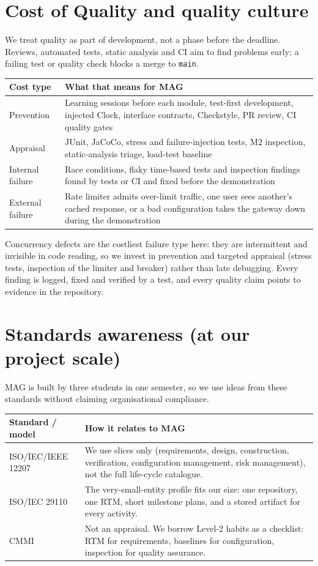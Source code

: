 \documentclass[11pt,a4paper]{article}
\begin{document}
\section{Cost of Quality and quality culture}
We treat quality as part of development, not a phase before the deadline. Reviews, automated tests, static analysis and CI aim to find problems early; a failing test or quality check blocks a merge to \texttt{main}.

\begin{longtable}{L{3.0cm} L{11.8cm}}
\toprule
\textbf{Cost type} & \textbf{What that means for MAG} \\
\midrule
\endhead
Prevention & Learning sessions before each module, test-first development, injected Clock, interface contracts, Checkstyle, PR review, CI quality gates \\
Appraisal & JUnit, JaCoCo, stress and failure-injection tests, M2 inspection, static-analysis triage, load-test baseline \\
Internal failure & Race conditions, flaky time-based tests and inspection findings found by tests or CI and fixed before the demonstration \\
External failure & Rate limiter admits over-limit traffic, one user sees another's cached response, or a bad configuration takes the gateway down during the demonstration \\
\bottomrule
\end{longtable}

Concurrency defects are the costliest failure type here: they are intermittent and invisible in code reading, so we invest in prevention and targeted appraisal (stress tests, inspection of the limiter and breaker) rather than late debugging. Every finding is logged, fixed and verified by a test, and every quality claim points to evidence in the repository.

\section{Standards awareness (at our project scale)}
MAG is built by three students in one semester, so we use ideas from these standards without claiming organisational compliance.

\begin{longtable}{L{3.6cm} L{11.2cm}}
\toprule
\textbf{Standard / model} & \textbf{How it relates to MAG} \\
\midrule
\endhead
ISO/IEC/IEEE 12207 & We use slices only (requirements, design, construction, verification, configuration management, risk management), not the full life-cycle catalogue. \\
ISO/IEC 29110 & The very-small-entity profile fits our size: one repository, one RTM, short milestone plans, and a stored artifact for every activity. \\
CMMI & Not an appraisal. We borrow Level-2 habits as a checklist: RTM for requirements, baselines for configuration, inspection for quality assurance. \\
\bottomrule
\end{longtable}
\end{document}

